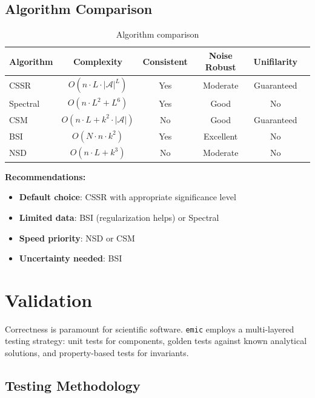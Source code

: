 \documentclass[11pt,a4paper]{report}
\theoremstyle{definition}
\theoremstyle{plain}
\newcommand{\emic}{\texttt{emic}}
\begin{document}
\section{Algorithm Comparison}

\begin{table}[h]
\centering
\caption{Algorithm comparison}
\label{tab:algorithms}
\begin{tabular}{lccccc}
\toprule
Algorithm & Complexity & Consistent & Noise Robust & Unifilarity \\
\midrule
CSSR & $O(n \cdot L \cdot |\mathcal{A}|^L)$ & Yes & Moderate & Guaranteed \\
Spectral & $O(n \cdot L^2 + L^6)$ & Yes & Good & No \\
CSM & $O(n \cdot L + k^2 \cdot |\mathcal{A}|)$ & No & Good & Guaranteed \\
BSI & $O(N \cdot n \cdot k^2)$ & Yes & Excellent & No \\
NSD & $O(n \cdot L + k^3)$ & No & Moderate & No \\
\bottomrule
\end{tabular}
\end{table}

\textbf{Recommendations:}
\begin{itemize}
    \item \textbf{Default choice}: CSSR with appropriate significance level
    \item \textbf{Limited data}: BSI (regularization helps) or Spectral
    \item \textbf{Speed priority}: NSD or CSM
    \item \textbf{Uncertainty needed}: BSI
\end{itemize}

\chapter{Validation}
\label{ch:validation}

Correctness is paramount for scientific software. \emic{} employs a multi-layered testing strategy: unit tests for components, golden tests against known analytical solutions, and property-based tests for invariants.

\section{Testing Methodology}
\end{document}
